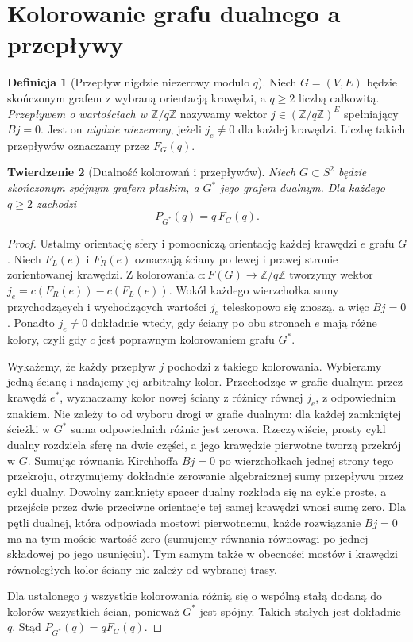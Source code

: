 \documentclass[11pt,a4paper]{report}
\numberwithin{equation}{section}
\theoremstyle{plain}
\newtheorem{twierdzenie}{Twierdzenie}[section]
\theoremstyle{definition}
\newtheorem{definicja}[twierdzenie]{Definicja}
\theoremstyle{remark}
\begin{document}
\section{Kolorowanie grafu dualnego a przepływy}
\label{sec:tg-flows-duality}

\begin{definicja}[Przepływ nigdzie niezerowy modulo $q$]
Niech $G=(V,E)$ będzie skończonym grafem z wybraną
orientacją krawędzi, a $q\ge2$ liczbą całkowitą.
\emph{Przepływem o wartościach w $\mathbb Z/q\mathbb Z$}
nazywamy wektor $j\in(\mathbb Z/q\mathbb Z)^E$
spełniający $Bj=0$. Jest on \emph{nigdzie niezerowy}, jeżeli
$j_e\ne0$ dla każdej krawędzi. Liczbę takich przepływów
oznaczamy przez $F_G(q)$.
\end{definicja}

\begin{twierdzenie}[Dualność kolorowań i przepływów]
\label{thm:tg-flow-color-dual}
Niech $G\subset S^2$ będzie skończonym spójnym grafem płaskim,
a $G^*$ jego grafem dualnym. Dla każdego $q\ge2$ zachodzi
\[
 P_{G^*}(q)=q\,F_G(q).
\]
\end{twierdzenie}

\begin{proof}
Ustalmy orientację sfery i pomocniczą orientację każdej
krawędzi $e$ grafu $G$. Niech $F_L(e)$ i $F_R(e)$ oznaczają
ściany po lewej i prawej stronie zorientowanej krawędzi.
Z kolorowania $c:F(G)\to\mathbb Z/q\mathbb Z$ tworzymy
wektor $j_e=c(F_R(e))-c(F_L(e))$.
Wokół każdego wierzchołka sumy przychodzących i wychodzących
wartości $j_e$ teleskopowo się znoszą, a więc $Bj=0$.
Ponadto $j_e\ne0$ dokładnie wtedy, gdy ściany po obu
stronach $e$ mają różne kolory, czyli gdy $c$ jest
poprawnym kolorowaniem grafu $G^*$.

Wykażemy, że każdy przepływ $j$ pochodzi z takiego
kolorowania. Wybieramy jedną ścianę i nadajemy jej
arbitralny kolor. Przechodząc w grafie dualnym przez
krawędź $e^*$, wyznaczamy kolor nowej ściany
z różnicy równej $j_e$, z odpowiednim znakiem.
Nie zależy to od wyboru drogi w grafie dualnym:
dla każdej zamkniętej ścieżki w $G^*$ suma odpowiednich
różnic jest zerowa. Rzeczywiście, prosty cykl dualny
rozdziela sferę na dwie części, a jego krawędzie
pierwotne tworzą przekrój w $G$. Sumując równania
Kirchhoffa $Bj=0$ po wierzchołkach jednej strony
tego przekroju, otrzymujemy dokładnie zerowanie
algebraicznej sumy przepływu przez cykl dualny.
Dowolny zamknięty spacer dualny rozkłada się na cykle
proste, a przejście przez dwie przeciwne orientacje tej
samej krawędzi wnosi sumę zero. Dla pętli dualnej,
która odpowiada mostowi pierwotnemu, każde rozwiązanie
$Bj=0$ ma na tym moście wartość zero (sumujemy równania
równowagi po jednej składowej po jego usunięciu).
Tym samym także w obecności mostów i krawędzi
równoległych kolor ściany nie zależy od wybranej trasy.

Dla ustalonego $j$ wszystkie kolorowania różnią się
o wspólną stałą dodaną do kolorów wszystkich ścian,
ponieważ $G^*$ jest spójny. Takich stałych jest dokładnie
$q$. Stąd $P_{G^*}(q)=qF_G(q)$.
\end{proof}
\end{document}
